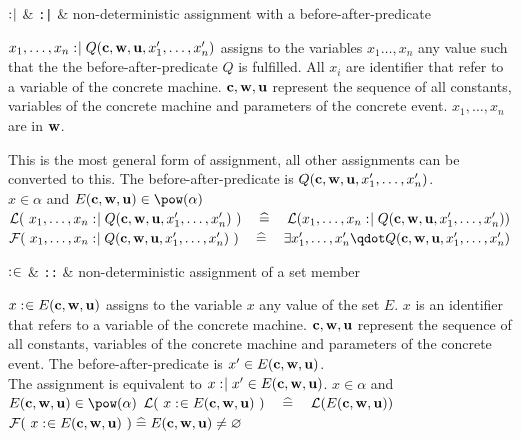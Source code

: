 \begin{rrnames}
  $\mathrel{:\mkern1mu\mid}$ & \texttt{:|} & non-deterministic assignment with a before-after-predicate
\end{rrnames}
\begin{rodinrefentry}
  \rrdesc
    $x_1,\ldots,x_n \mathrel{:\mkern1mu\mid} Q(\mathbf{c},\mathbf{w},\mathbf{u},x_1',\ldots,x_n')$
    assigns to the variables $x_1\ldots,x_n$ any value such that the the
    before-after-predicate $Q$ is fulfilled.
    All $x_i$ are identifier that refer to a variable of the concrete machine.
    $\mathbf{c},\mathbf{w},\mathbf{u}$ represent the sequence of all constants, 
    variables of the concrete machine and parameters of the concrete event.
    $x_1,\ldots,x_n$ are in $\mathbf{w}$.

    This is the most general form of assignment, all other assignments can be converted to this.
  \rrdef
    The before-after-predicate is $Q(\mathbf{c},\mathbf{w},\mathbf{u},x_1',\ldots,x_n')$. \\
  \rrtypes
    $x\in\alpha$ and $\eventbassignmentexpr{}\in\pow(\alpha)$
  \rrwd
    $\mathcal{L}(~x_1,\ldots,x_n \mathrel{:\mkern1mu\mid} Q(\mathbf{c},\mathbf{w},\mathbf{u},x_1',\ldots,x_n')~)
    \quad\mathrel{\widehat=}\quad
    \mathcal{L}(x_1,\ldots,x_n \mathrel{:\mkern1mu\mid} Q(\mathbf{c},\mathbf{w},\mathbf{u},x_1',\ldots,x_n'))$
  \rrfis
    $\actfis(~x_1,\ldots,x_n \bcmsuch Q(\allconstants,\concvariables,\concparameters,x_1',\ldots,x_n')~)
      \quad\defi\quad
      \exists x_1',\ldots,x_n' \qdot Q(\allconstants,\concvariables,\concparameters,x_1',\ldots,x_n')$
\end{rodinrefentry}

\begin{rrnames}
  $\mathrel{:\mkern1mu\in}$ & \texttt{::} & non-deterministic assignment of a set member
\end{rrnames}
\begin{rodinrefentry}
  \rrdesc
    $x \mathrel{:\mkern1mu\in} E_{}(\mathbf{c},\mathbf{w},\mathbf{u})$ assigns to the variable $x$ any value of the
    set $E$. $x$ is an identifier that refers to a variable
    of the concrete machine.
    $\mathbf{c},\mathbf{w},\mathbf{u}$ represent the sequence of all constants, 
    variables of the concrete machine and parameters of the concrete event.
  \rrdef
    The before-after-predicate is $x' \in E_{}(\mathbf{c},\mathbf{w},\mathbf{u})$. \\
    The assignment is equivalent to
    $x \mathrel{:\mkern1mu\mid} x' \in E_{}(\mathbf{c},\mathbf{w},\mathbf{u})$.
  \rrtypes
    $x\in\alpha$ and $\eventbassignmentexpr{}\in\pow(\alpha)$
  \rrwd
    $\mathcal{L}(~x \mathrel{:\mkern1mu\in}E_{}(\mathbf{c},\mathbf{w},\mathbf{u})~)
    \quad\mathrel{\widehat=}\quad
    \mathcal{L}(E(\mathbf{c},\mathbf{w},\mathbf{u}))$
  \rrfis
    $\mathcal{F}(~x \mathrel{:\mkern1mu\in} E_{}(\mathbf{c},\mathbf{w},\mathbf{u})~) \mathrel{\widehat=} E_{}(\mathbf{c},\mathbf{w},\mathbf{u})\neq\mathord\varnothing$
\end{rodinrefentry}



